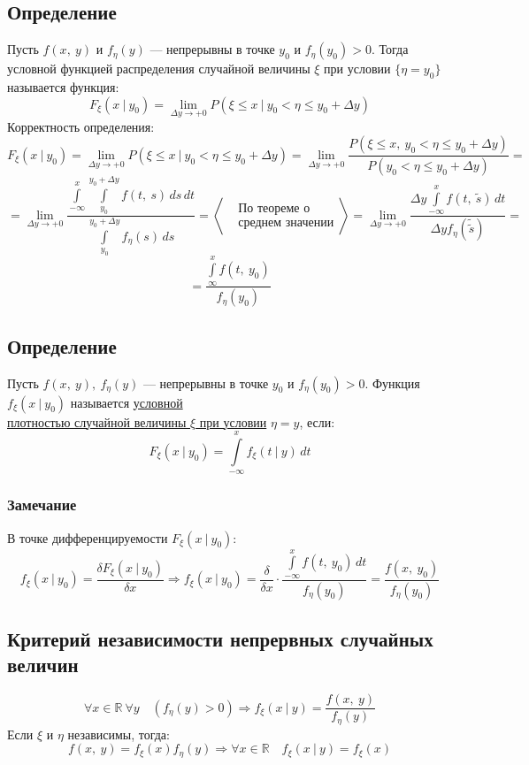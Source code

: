 \documentclass[12pt, a4paper]{article}
\begin{document}
    \subsection*{Определение}
    Пусть $f(x,\ y)$ и $f_{\eta}(y)$ --- непрерывны в точке $y_0$ и $f_{\eta}(y_0) > 0$. Тогда условной функцией распределения случайной величины $\xi$ при условии $\{\eta = y_0\}$ называется функция:
    \[F_{\xi}(x\ \big|\ y_0) = \lim_{\Delta y\to +0} P(\xi \leq x\ \big|\ y_0 < \eta \leq y_0 + \Delta y)\]
    Корректность определения:
    \[F_{\xi}(x\ \big|\ y_0) = \lim_{\Delta y\to +0} P(\xi \leq x\ \big|\ y_0 < \eta \leq y_0 + \Delta y) = \lim_{\Delta y\to +0} \frac{P(\xi \leq x,\ y_0 < \eta \leq y_0 + \Delta y)}{P(y_0 < \eta \leq y_0 + \Delta y)} =\]
    \[= \lim_{\Delta y \to +0}\dfrac{\displaystyle \int\limits_{-\infty}^{x}\int\limits_{y_0}^{y_0 + \Delta y} f(t,\ s)\, ds\, dt}{\displaystyle\int\limits_{y_0}^{y_0 + \Delta y} f_{\eta}(s)\, ds} = \left< \begin{aligned}
        & \text{По теореме о}\\
        & \text{среднем значении}
    \end{aligned} \right> = \lim_{\Delta y\to +0} \dfrac{\displaystyle \Delta y\int\limits_{-\infty}^{x} f(t,\ \tilde{s})\, dt}{\Delta y f_{\eta}\left(\tilde{\tilde{s}}\right)} =\]
    \[= \frac{\displaystyle\int\limits_{\infty}^{x}f(t,\ y_0)}{f_{\eta}(y_0)}\]
    \subsection*{Определение}
    Пусть $f(x,\ y),\ f_{\eta}(y)$ --- непрерывны в точке $y_0$ и $f_{\eta}(y_0) > 0$. Функция $f_{\xi}(x\ |\ y_0)$ называется \underline{условной}\\ \underline{плотностью случайной величины $\xi$ при условии} $\eta = y$, если:
    \[F_{\xi}(x\ \big|\ y_0) = \int\limits_{-\infty}^{x} f_{\xi}(t\ \big|\ y)\, dt\]
    \subsubsection*{Замечание}
    В точке дифференцируемости $F_{\xi}(x\ \big|\ y_0)$:
    \[f_{\xi}(x\ \big|\ y_0) = \frac{\delta F_{\xi}(x\ \big|\ y_0)}{\delta x}\Rightarrow f_{\xi}(x\ \big|\ y_0) = \frac{\delta}{\delta x}\cdot\frac{\displaystyle\int\limits_{-\infty}^{x}f(t,\ y_0)\, dt}{f_{\eta}(y_0)} = \frac{f(x,\ y_0)}{f_{\eta}(y_0)}\]
    \subsection*{Критерий независимости непрервных случайных величин}
    \[\forall x\in \mathbb{R}\ \forall y\quad (f_{\eta}(y) > 0) \Rightarrow f_{\xi}(x\ \big|\ y) = \frac{f(x,\ y)}{f_{\eta}(y)}\]
    Если $\xi$ и $\eta$ независимы, тогда: 
    \[f(x,\ y) = f_{\xi}(x)f_{\eta}(y)\Rightarrow \forall x\in \mathbb{R}\quad  f_{\xi}(x\ \big|\ y) = f_{\xi}(x)\]
\end{document}
